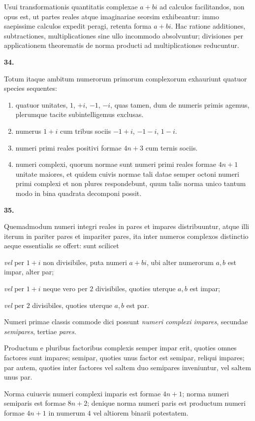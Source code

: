 \documentclass[12pt,a4paper]{article}
\newcommand{\art}[1]{\begin{center}\textbf{#1.}\end{center}}
\begin{document}
Usui transformationis quantitatis complexae $a+bi$ ad calculos facilitandos, non opus est, ut partes reales atque imaginariae seorsim exhibeantur: immo saepissime calculos expedit peragi, retenta forma $a+bi$. Hac ratione additiones, subtractiones, multiplicationes sine ullo incommodo absolvuntur; divisiones per applicationem theorematis de norma producti ad multiplicationes reducuntur.

\art{34}

Totum itaque ambitum numerorum primorum complexorum exhauriunt quatuor species sequentes:
\begin{enumerate}[label=\arabic*)]
\item quatuor unitates, $1$, $+i$, $-1$, $-i$, quas tamen, dum de numeris primis agemus, plerumque tacite subintelligemus exclusas.
\item numerus $1+i$ cum tribus sociis $-1+i$, $-1-i$, $1-i$.
\item numeri primi reales positivi formae $4n+3$ cum ternis sociis.
\item numeri complexi, quorum normae sunt numeri primi reales formae $4n+1$ unitate maiores, et quidem cuivis normae tali datae semper octoni numeri primi complexi et non plures respondebunt, quum talis norma unico tantum modo in bina quadrata decomponi possit.
\end{enumerate}

\art{35}

Quemadmodum numeri integri reales in pares et impares distribuuntur, atque illi iterum in pariter pares et impariter pares, ita inter numeros complexos distinctio aeque essentialis se offert: sunt scilicet

\textit{vel} per $1+i$ non divisibiles, puta numeri $a+bi$, ubi alter numerorum $a,b$ est impar, alter par;

\textit{vel} per $1+i$ neque vero per $2$ divisibiles, quoties uterque $a,b$ est impar;

\textit{vel} per $2$ divisibiles, quoties uterque $a,b$ est par.

Numeri primae classis commode dici possunt \textit{numeri complexi impares}, secundae \textit{semipares}, tertiae \textit{pares}.

Productum e pluribus factoribus complexis semper impar erit, quoties omnes factores sunt impares; semipar, quoties unus factor est semipar, reliqui impares; par autem, quoties inter factores vel saltem duo semipares inveniuntur, vel saltem unus par.

Norma cuiusvis numeri complexi imparis est formae $4n+1$; norma numeri semiparis est formae $8n+2$; denique norma numeri paris est productum numeri formae $4n+1$ in numerum $4$ vel altiorem binarii potestatem.
\end{document}
